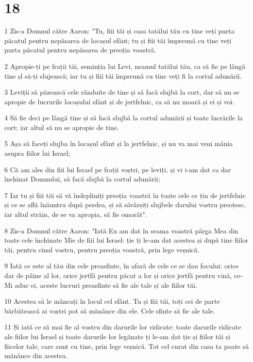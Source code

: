 \chapter{18}

\par 1 Zis-a Domnul către Aaron: "Tu, fiii tăi și casa tatălui tău cu tine veți purta păcatul pentru nepăsarea de locașul sfânt; tu și fiii tăi împreună cu tine veți purta păcatul pentru nepăsarea de preoția voastră.
\par 2 Apropie-ți pe frații tăi, seminția lui Levi, neamul tatălui tău, ca să fie pe lângă tine șl să-ți slujească; iar tu și fiii tăi împreună cu tine veți fi la cortul adunării.
\par 3 Leviții să păzească cele rânduite de tine și să facă slujbă la cort, dar să nu se apropie de lucrurile locașului sfânt și de jertfelnic, ca să nu moară și ei și voi.
\par 4 Să fie deci pe lângă tine și să facă slujbă la cortul adunării și toate lucrările la cort; iar altul să nu se apropie de tine.
\par 5 Așa să faceți slujba în locașul sfânt și la jertfelnic, și nu va mai veni mânia asupra fiilor lui Israel;
\par 6 Că am ales din fiii lui Israel pe frații voștri, pe leviți, și vi i-am dat ca dar închinat Domnului, să facă slujbă la cortul adunării;
\par 7 Iar tu și fiii tăi să vă îndepliniți preoția voastră în toate cele ce țin de jertfelnic și ce se află înăuntru după perdea, și să săvârșiți slujbele darului vostru preoțesc, iar altul străin, de se va apropia, să fie omorât".
\par 8 Zis-a Domnul către Aaron: "Iată Eu am dat în seama voastră pârga Mea din toate cele închinate Mie de fiii lui Israel: ție ți le-am dat acestea și după tine fiilor tăi, pentru cinul vostru, pentru preoția voastră, prin lege veșnică.
\par 9 Iată ce este al tău din cele preasfinte, în afară de cele ce se dau focului: orice dar de pâine al lor, orice jertfă pentru păcat a lor și orice jertfă pentru vină, ce-Mi aduc ei, aceste lucruri preasfinte să fie ale tale și ale fiilor tăi.
\par 10 Acestea să le mâncați în locul cel sfânt. Tu și fiii tăi, toți cei de parte bărbătească ai voștri pot să mănânce din ele. Cele sfinte să fie ale tale.
\par 11 Și iată ce să mai fie al vostru din darurile lor ridicate: toate darurile ridicate ale fiilor lui Israel și toate darurile lor legănate ți le-am dat ție și fiilor tăi și fiicelor tale, care sunt cu tine, prin lege veșnică. Tot cel curat din casa ta poate să mănânce din acestea.
